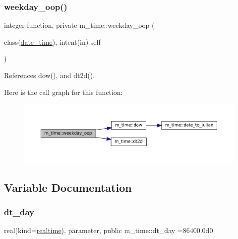 \subsubsection{\texorpdfstring{weekday\+\_\+oop()}{weekday\_oop()}}
{\footnotesize\ttfamily integer function, private m\+\_\+time\+::weekday\+\_\+oop (\begin{DoxyParamCaption}\item[{class(\mbox{\hyperlink{structm__time_1_1date__time}{date\+\_\+time}}), intent(in)}]{self }\end{DoxyParamCaption})\hspace{0.3cm}{\ttfamily [private]}}



References dow(), and dt2d().

Here is the call graph for this function\+:\nopagebreak
\begin{figure}[H]
\begin{center}
\leavevmode
\includegraphics[width=350pt]{namespacem__time_ac43e082c8ffd7687c4fc91beddc15720_cgraph}
\end{center}
\end{figure}


\subsection{Variable Documentation}
\mbox{\label{namespacem__time_a97725f8d657c24badff19a794f323a6b}} 
\subsubsection{\texorpdfstring{dt\+\_\+day}{dt\_day}}
{\footnotesize\ttfamily real(kind=\mbox{\hyperlink{namespacem__time_ac10ea9e8d59ec74eaa7d89f2517d7422}{realtime}}), parameter, public m\+\_\+time\+::dt\+\_\+day =86400.\+0d0}

\mbox{\label{namespacem__time_aa0ca2172092f5e7dcc9b8524e6516fd8}} 
